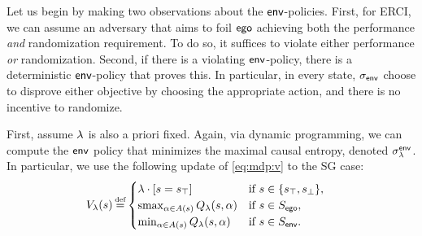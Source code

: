  Let us begin by making two observations
about the $\mathsf{env}$-policies.  First, for ERCI, we can assume an
adversary that aims to foil $\mathsf{ego}$ achieving both the
performance \emph{and} randomization requirement.  To do so, it
suffices to violate either performance \emph{or} randomization.
Second, if there is a violating $\mathsf{env}$-policy, there is a
deterministic $\mathsf{env}$-policy that proves this.  In particular, in
every state, ${\sigma_{\mathsf{env}}}$ choose to disprove either objective by
choosing the appropriate action, and there is no incentive to
randomize.


First, assume $\lambda$ is also a priori fixed.  
Again, via dynamic programming, we can compute the
$\mathsf{env}$ policy that minimizes the maximal causal entropy, denoted $\sigma_\lambda^{\mathsf{env}}$.
In particular, we use the following update of \eqref{eq:mdp:v} to the SG case:
 \begin{align}
   & V_\rat(s) \eqdef  \begin{cases}
     \lambda  \cdot \indicator{s = \target} & \text{if }s \in \{ \target, \sink \},\\
     \smoothmax_{\act \in \EnAct(s)}{  Q_\rat(s,\act) } & \text{if } s \in S_\pOne, \\
     \min_{\act \in \EnAct(s)}{  Q_\rat(s,\act) } &  \text{if } s \in S_\pTwo.
   \end{cases}
 \end{align}


